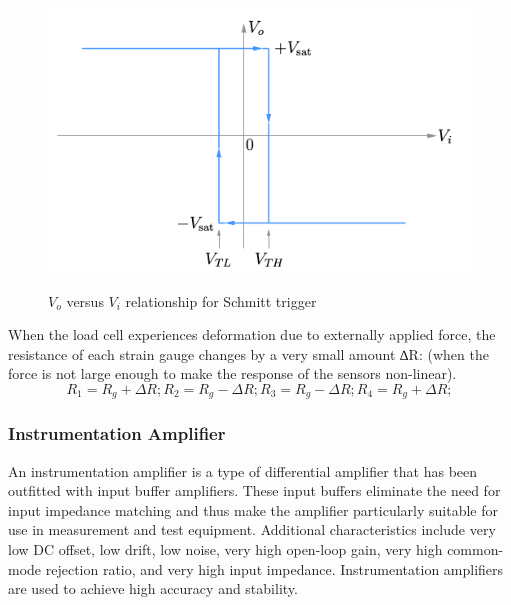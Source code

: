 \documentclass[12pt]{article}
\begin{document}
            \begin{figure}[H]
                \centering
                \includegraphics[width = 0.7\linewidth, height = 3in]{reports/lab2/scmiii.png}
                \caption{$V_o$ versus $V_i$ relationship for Schmitt trigger}
            \end{figure}
            \noindent
            When the load cell experiences deformation due to externally applied force, the resistance of each strain gauge changes by a very small amount ∆R: (when the force is not large enough to make the response of the sensors non-linear).
            \begin{equation}
                R_1 = R_g + \Delta R; R_2 = R_g - \Delta R; R_3 = R_g - \Delta R; R_4 = R_g + \Delta R; 
            \end{equation}
    
        \subsubsection{Instrumentation Amplifier}
            An instrumentation amplifier is a type of differential amplifier that has been outfitted with input buffer amplifiers. These input buffers eliminate the need for input impedance matching and thus make the amplifier particularly suitable for use in measurement and test equipment. Additional characteristics include very low DC offset, low drift, low noise, very high open-loop gain, very high common-mode rejection ratio, and very high input impedance. Instrumentation amplifiers are used to achieve high accuracy and stability.
            \\
            
\end{document}
